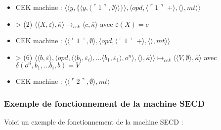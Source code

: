 \documentclass[10pt,a4paper]{article}
\begin{document}
\begin{itemize}
					\item[] CEK machine : $\langle\langle y,\{\langle y,\langle\ulcorner 1\urcorner,\emptyset\rangle\rangle\}\rangle,\langle opd,\langle\ulcorner 1\urcorner$ $+\rangle,\langle\rangle,mt\rangle\rangle$
					\item[] > (2) $\langle\langle X,\varepsilon\rangle,\overline{\kappa}\rangle \longmapsto_{cek} \langle c,\overline{\kappa}\rangle$ avec $\varepsilon(X) = c$
					\item[] CEK machine : $\langle\langle\ulcorner 1\urcorner,\emptyset\rangle,\langle opd,\langle\ulcorner 1\urcorner$ $+\rangle,\langle\rangle,mt\rangle\rangle$
					\item[] > (6) $\langle  \langle b,\varepsilon\rangle,\langle opd,\langle \langle b_{i},\varepsilon_{i}\rangle,...\langle b_{1},\varepsilon_{1}\rangle ,o^{n}\rangle,\langle\rangle,\overline{\kappa}\rangle\rangle \longmapsto_{cek} \langle \langle V,\emptyset\rangle,\overline{\kappa}\rangle$ avec $\delta(o^{n},b_{1},...b_{i},b) = V$
					\item[] CEK machine : $\langle\langle\ulcorner 2\urcorner,\emptyset\rangle,mt\rangle$
				\end{itemize}
				\newpage
			
			
				
			\subsubsection{Exemple de fonctionnement de la machine SECD}\label{SECD}
				
				Voici un exemple de fonctionnement de la machine SECD :	
					
\end{document}
